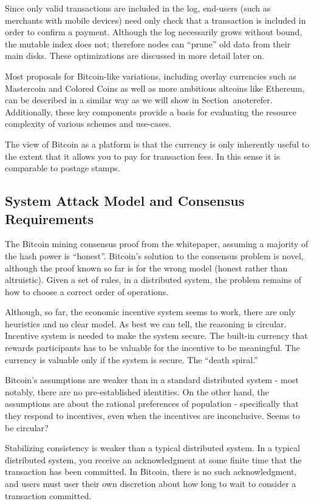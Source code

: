 Since only valid transactions are included in the log, end-users (such as merchants with mobile devices) need only check that a transaction is included in order to confirm a payment. Although the log necessarily grows without bound, the mutable index does not; therefore nodes can ``prune'' old data from their main disks. These optimizations are discussed in more detail later on.

Most proposals for Bitcoin-like variations, including overlay currencies such as Mastercoin and Colored Coins as well as more ambitious altcoins like Ethereum, can be described in a similar way as we will show in Section~anote{refer}. Additionally, these key components provide a basis for evaluating the resource complexity of various schemes and use-cases.

The view of Bitcoin as a platform is that the currency is only inherently useful to the extent that it allows you to pay for transaction fees. In this sense it is comparable to postage stamps.


\subsection{System Attack Model and Consensus Requirements}

The Bitcoin mining consensus proof from the whitepaper, assuming a majority of the hash power is ``honest''. Bitcoin's solution to the consensus problem is novel, although the proof known so far is for the wrong model (honest rather than altruistic). Given a set of rules, in a distributed system, the problem remains of how to choose a correct order of operations.

Although, so far, the economic incentive system seems to work, there are only heuristics and no clear model. As best we can tell, the reasoning is circular. Incentive system is needed to make the system secure. The built-in currency that rewards participants has to be valuable for the incentive to be meaningful. The currency is valuable only if the system is secure. The ``death spiral.''

Bitcoin's assumptions are weaker than in a standard distributed system - most notably, there are no pre-established identities. On the other hand, the assumptions are about the rational preferences of population - specifically that they respond to incentives, even when the incentives are inconclusive. Seems to be circular?

Stabilizing consistency is weaker than a typical distributed system. In a typical distributed system, you receive an acknowledgment at some finite time that the transaction has been committed. In Bitcoin, there is no such acknowledgment, and users must user their own discretion about how long to wait to consider a transaction committed. 

